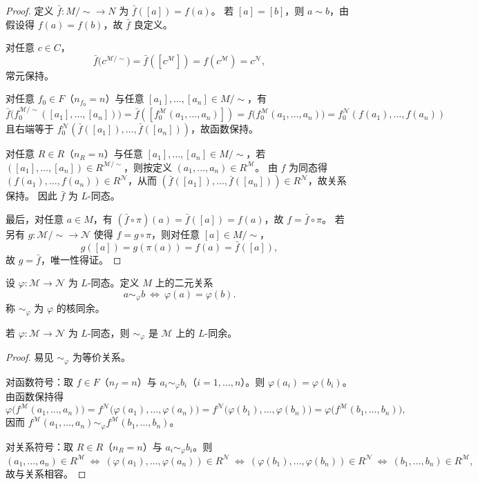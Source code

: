 \documentclass[lang=cn,a4paper,newtx,section]{elegantbook}
\begin{document}
\begin{proof}
定义 $\bar f:M/\!\sim\to N$ 为 $\bar f([a])=f(a)$。
若 $[a]=[b]$，则 $a\sim b$，由假设得 $f(a)=f(b)$，故 $\bar f$ 良定义。

对任意 $c\in C$，
\[
  \bar f\bigl(c^{\mathcal M/\!\sim}\bigr)=\bar f([c^{\mathcal M}])=f(c^{\mathcal M})=c^{\mathcal N},
\]
常元保持。

对任意 $f_0\in F$（$n_{f_0}=n$）与任意 $[a_1],\dots,[a_n]\in M/\!\sim$，有
\[
  \bar f\bigl(f_0^{\mathcal M/\!\sim}([a_1],\dots,[a_n])\bigr)=\bar f([f_0^{\mathcal M}(a_1,\dots,a_n)])=f\bigl(f_0^{\mathcal M}(a_1,\dots,a_n)\bigr)=f_0^{\mathcal N}(f(a_1),\dots,f(a_n))
\]
且右端等于 $f_0^{\mathcal N}(\bar f([a_1]),\dots,\bar f([a_n]))$，故函数保持。

对任意 $R\in R$（$n_R=n$）与任意 $[a_1],\dots,[a_n]\in M/\!\sim$，若 $([a_1],\dots,[a_n])\in R^{\mathcal M/\!\sim}$，则按定义 $(a_1,\dots,a_n)\in R^{\mathcal M}$。
由 $f$ 为同态得 $(f(a_1),\dots,f(a_n))\in R^{\mathcal N}$，从而 $(\bar f([a_1]),\dots,\bar f([a_n]))\in R^{\mathcal N}$，故关系保持。
因此 $\bar f$ 为 $L$-同态。

最后，对任意 $a\in M$，有 $(\bar f\circ\pi)(a)=\bar f([a])=f(a)$，故 $f=\bar f\circ\pi$。
若另有 $g:\mathcal M/\!\sim\to\mathcal N$ 使得 $f=g\circ\pi$，则对任意 $[a]\in M/\!\sim$，
\[
  g([a])=g(\pi(a))=f(a)=\bar f([a]),
\]
故 $g=\bar f$，唯一性得证。
\end{proof}

\begin{definition}[同态核诱导的同余]
设 $\varphi:\mathcal M\to\mathcal N$ 为 $L$-同态。定义 $M$ 上的二元关系
\[
  a\sim_{\varphi} b\ \Longleftrightarrow\ \varphi(a)=\varphi(b).
\]
称 $\sim_{\varphi}$ 为 $\varphi$ 的核同余。
\end{definition}

\begin{proposition}
若 $\varphi:\mathcal M\to\mathcal N$ 为 $L$-同态，则 $\sim_{\varphi}$ 是 $\mathcal M$ 上的 $L$-同余。
\end{proposition}

\begin{proof}
易见 $\sim_{\varphi}$ 为等价关系。

对函数符号：取 $f\in F$（$n_f=n$）与 $a_i\sim_{\varphi} b_i$（$i=1,\dots,n$）。则 $\varphi(a_i)=\varphi(b_i)$。
由函数保持得
\[
  \varphi\bigl(f^{\mathcal M}(a_1,\dots,a_n)\bigr)=f^{\mathcal N}\bigl(\varphi(a_1),\dots,\varphi(a_n)\bigr)=f^{\mathcal N}\bigl(\varphi(b_1),\dots,\varphi(b_n)\bigr)=\varphi\bigl(f^{\mathcal M}(b_1,\dots,b_n)\bigr),
\]
因而 $f^{\mathcal M}(a_1,\dots,a_n)\sim_{\varphi} f^{\mathcal M}(b_1,\dots,b_n)$。

对关系符号：取 $R\in R$（$n_R=n$）与 $a_i\sim_{\varphi} b_i$。则
\[
  (a_1,\dots,a_n)\in R^{\mathcal M}\ \Longleftrightarrow\ (\varphi(a_1),\dots,\varphi(a_n))\in R^{\mathcal N}\ \Longleftrightarrow\ (\varphi(b_1),\dots,\varphi(b_n))\in R^{\mathcal N}\ \Longleftrightarrow\ (b_1,\dots,b_n)\in R^{\mathcal M},
\]
故与关系相容。
\end{proof}
\end{document}
